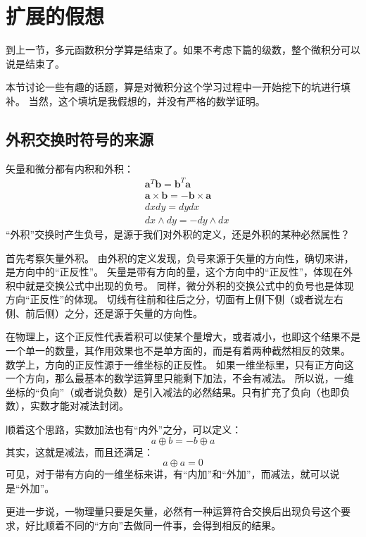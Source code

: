 \section{扩展的假想}

到上一节，多元函数积分学算是结束了。如果不考虑下篇的级数，整个微积分可以说是结束了。

本节讨论一些有趣的话题，算是对微积分这个学习过程中一开始挖下的坑进行填补。
当然，这个填坑是我假想的，并没有严格的数学证明。

\subsection{外积交换时符号的来源}

矢量和微分都有内积和外积：
\begin{align*}
&\boldsymbol{a}^T\boldsymbol{b}=\boldsymbol{b}^T\boldsymbol{a} \\
&\boldsymbol{a}\times \boldsymbol{b}=-\boldsymbol{b}\times \boldsymbol{a} \\
&dxdy=dydx \\
&dx\land dy=-dy\land dx
\end{align*}
“外积”交换时产生负号，是源于我们对外积的定义，还是外积的某种必然属性？

首先考察矢量外积。
由外积的定义发现，负号来源于矢量的方向性，确切来讲，是方向中的“正反性”。
矢量是带有方向的量，这个方向中的“正反性”，体现在外积中就是交换公式中出现的负号。
同样，微分外积的交换公式中的负号也是体现方向“正反性”的体现。
切线有往前和往后之分，切面有上侧下侧（或者说左右侧、前后侧）之分，还是源于矢量的方向性。

在物理上，这个正反性代表着积可以使某个量增大，或者减小，也即这个结果不是一个单一的数量，其作用效果也不是单方面的，而是有着两种截然相反的效果。
数学上，方向的正反性源于一维坐标的正反性。
如果一维坐标里，只有正方向这一个方向，那么最基本的数学运算里只能剩下加法，不会有减法。
所以说，一维坐标的“负向”（或者说负数）是引入减法的必然结果。只有扩充了负向（也即负数），实数才能对减法封闭。

顺着这个思路，实数加法也有“内外”之分，可以定义：
\[
a\oplus b=-b\oplus a
\]
其实，这就是减法，而且还满足：
\[
a\oplus a=0
\]
可见，对于带有方向的一维坐标来讲，有“内加”和“外加”，而减法，就可以说是“外加”。

更进一步说，一物理量只要是矢量，必然有一种运算符合交换后出现负号这个要求，好比顺着不同的“方向”去做同一件事，会得到相反的结果。

